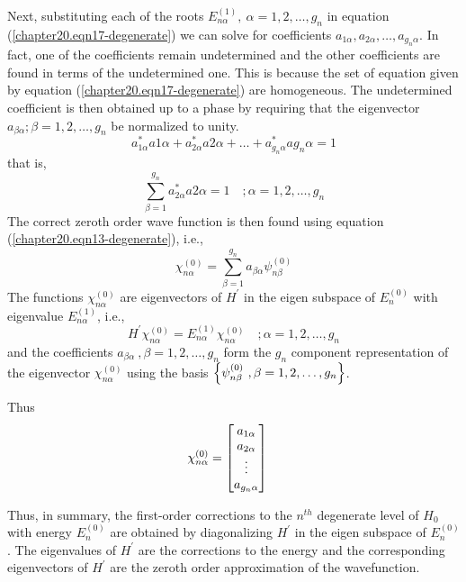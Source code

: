 		Next, substituting each of the roots $E_{n\alpha}^{(1)}, \ \alpha=1,2,\ldots,g_n$ in equation (\ref{chapter20.eqn17-degenerate}) we can solve for coefficients $a_{1\alpha}, a_{2 \alpha}, \ldots, a_{g_n \alpha}$. In fact, one of the coefficients remain undetermined and the other coefficients are found in terms of the undetermined one. This is because the set of equation given by equation (\ref{chapter20.eqn17-degenerate}) are homogeneous. The undetermined coefficient is then obtained up to a phase by requiring that the eigenvector $a_{\beta\alpha}; \beta = 1,2,\ldots, g_n$ be normalized to unity.
		\begin{equation}
			a^{*}_{1\alpha} a{1\alpha}  +  a^{*}_{2\alpha} a{2\alpha} + \ldots + a^{*}_{g_n\alpha} a{g_n\alpha} = 1
		\end{equation}
		that is,
		\begin{equation}
			\sum_{\beta = 1}^{g_n}	a^{*}_{2\alpha} a{2\alpha} = 1 \quad ; \alpha=1,2,\ldots, g_n
		\end{equation}
		The correct zeroth order wave function is then found using equation (\ref{chapter20.eqn13-degenerate}), i.e.,
		\begin{equation}
			\chi_{n\alpha}^{(0)} = \sum_{\beta = 1}^{g_n} a_{\beta\alpha} \psi_{n\beta}^{(0)}
		\end{equation}
		The functions $\chi_{n\alpha}^{(0)}$ are eigenvectors of $H^\prime$ in the eigen subspace of $E_n^{(0)}$ with eigenvalue $E_{n\alpha}^{(1)}$, i.e.,
		\begin{equation}
			H^\prime \chi_{n\alpha}^{(0)}= E_{n\alpha}^{(1)} \chi_{n\alpha}^{(0)} \quad ; \alpha = 1,2,\ldots, g_n
		\end{equation}
		and the coefficients $a_{\beta \alpha}\ , \beta=1,2, \ldots, g_n$ form the $g_n$ component representation of the eigenvector $\chi_{n\alpha}^{(0)}$ using the basis $\qty{\psi_{n\beta}^{(0)}\ , \beta =1,2, \ldots,g_n}$.
		
		Thus
		\begin{align}
			\chi_{n\alpha}^{(0)} &= \mqty[a_{1\alpha} \\ a_{2\alpha} \\ \vdots \\ a_{g_n\alpha}] 
		\end{align}
		
		Thus, in summary, the first-order corrections to the $n^{th}$ degenerate level of $H_0$ with energy $E_n^{(0)}$ are obtained by diagonalizing $H^\prime$ in the eigen subspace of $E_n^{(0)}$. The eigenvalues of $H^\prime$ are the corrections to the energy and the corresponding eigenvectors of $H^\prime$ are the zeroth order approximation of the wavefunction.\\
		
